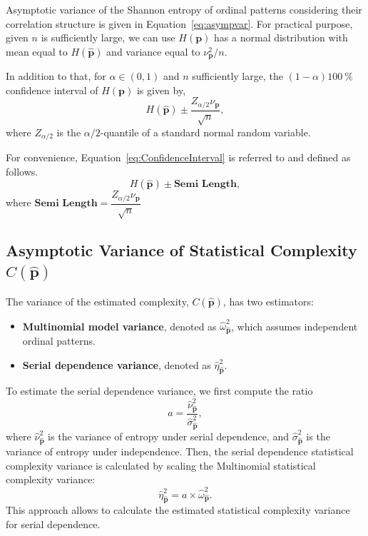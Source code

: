 Asymptotic variance of the Shannon entropy of ordinal patterns considering their correlation structure is given in Equation~\ref{eq:asympvar}.
For practical purpose, given $n$ is sufficiently large, we can use $H(\mathbf{p})$ has a normal distribution with mean equal to $H(\widehat{\mathbf{p}})$ and variance equal to $\nu^2_{\mathbf{p}}/n$. 

In addition to that, for $\alpha\in(0,1)$ and $n$ sufficiently large, the $(1-\alpha)\SI{100}{\percent}$ confidence interval of $H(\mathbf{p})$ is given by, 
\begin{equation}
  H(\widehat{\mathbf{p}})\pm \dfrac{Z_{\alpha/2}\nu_{\mathbf{p}}}{\sqrt{n}},
  \label{eq:ConfidenceInterval}
\end{equation} 
where $Z_{\alpha/2}$ is the $\alpha/2$-quantile of a standard normal random variable.

For convenience, Equation~\ref{eq:ConfidenceInterval} is referred to and defined as follows.
\begin{equation}
	H(\widehat{\mathbf{p}})\pm \textbf{Semi Length},
	\label{eq:CI}
\end{equation} 
where $\textbf{Semi Length}=\dfrac{Z_{\alpha/2}\nu_{\mathbf{p}}}{\sqrt{n}}$

\subsection{Asymptotic Variance of Statistical Complexity $C(\widehat{\mathbf{p}})$}\label{Subsec:AsympVarComplexity}

The variance of the estimated complexity, $C(\widehat{\mathbf{p}})$, has two estimators:
\begin{itemize}
	\item \textbf{Multinomial model variance}, denoted as $\widehat{\omega}^2_{\widehat{\mathbf{p}}}$, which assumes independent ordinal patterns.
	\item \textbf{Serial dependence variance}, denoted as $\widehat{\eta}^2_{\widehat{\mathbf{p}}}$.
\end{itemize}
To estimate the serial dependence variance, we first compute the ratio
$$
a = \dfrac{\widehat{\nu}^2_{\widehat{\mathbf{p}}}}{\widehat{\sigma}^2_{\widehat{\mathbf{p}}}},
$$
where $\widehat{\nu}^2_{\widehat{\mathbf{p}}}$ is the variance of entropy under serial dependence, and $\widehat{\sigma}^2_{\widehat{\mathbf{p}}}$ is the variance of entropy under independence.
Then, the serial dependence statistical complexity variance is calculated by scaling the Multinomial statistical complexity variance:
\[
\widehat{\eta}^2_{\widehat{\mathbf{p}}} = a \times \widehat{\omega}^2_{\widehat{\mathbf{p}}}.
\]
This approach allows to calculate the estimated statistical complexity variance for serial dependence.


